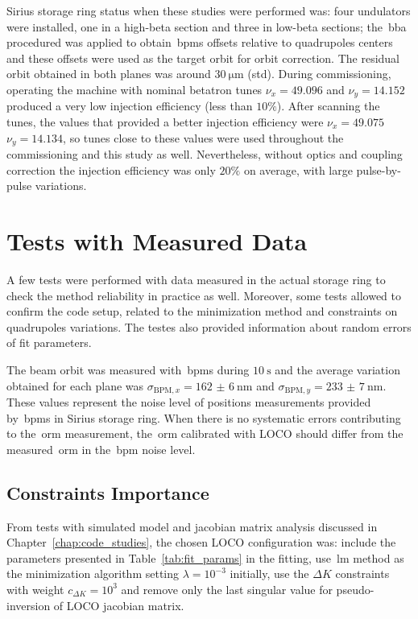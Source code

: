 Sirius storage ring status when these studies were performed was: four undulators were installed, one in a high-beta section and three in low-beta sections; the~\gls{bba} procedured was applied to obtain~\glspl{bpm} offsets relative to quadrupoles centers and these offsets were used as the target orbit for orbit correction. The residual orbit obtained in both planes was around $\SI{30}{\micro\meter}$ (\gls{std}). During commissioning, operating the machine with nominal betatron tunes $\nu_x = 49.096$ and $\nu_y = 14.152$ produced a very low injection efficiency (less than $10\%$). After scanning the tunes, the values that provided a better injection efficiency were $\nu_x = 49.075$ $\nu_y = 14.134$, so tunes close to these values were used throughout the commissioning and this study as well. Nevertheless, without optics and coupling correction the injection efficiency was only $20\%$ on average, with large pulse-by-pulse variations.
\section{Tests with Measured Data}\label{sec:tests_measured}
A few tests were performed with data measured in the actual storage ring to check the method reliability in practice as well. Moreover, some tests allowed to confirm the code setup, related to the minimization method and constraints on quadrupoles variations. The testes also provided information about random errors of fit parameters.

The beam orbit was measured with~\glspl{bpm} during $\SI{10}{\second}$ and the average variation obtained for each plane was $\sigma_{\mathrm{BPM}, x} = \SI{162(6)}{\nano\meter}$ and $\sigma_{\mathrm{BPM}, y} = \SI{233(7)}{\nano\meter}$. These values represent the noise level of positions measurements provided by~\glspl{bpm} in Sirius storage ring. When there is no systematic errors contributing to the~\gls{orm} measurement, the~\gls{orm} calibrated with LOCO should differ from the measured~\gls{orm} in the~\gls{bpm} noise level.

\subsection{Constraints Importance}\label{subsec:loco_config}
From tests with simulated model and jacobian matrix analysis discussed in Chapter~\ref{chap:code_studies}, the chosen LOCO configuration was: include the parameters presented in Table~\ref{tab:fit_params} in the fitting, use~\gls{lm} method as the minimization algorithm setting $\lambda = 10^{-3}$ initially, use the $\Delta K$ constraints with weight $c_{\Delta K} = 10^{3}$ and remove only the last singular value for pseudo-inversion of LOCO jacobian matrix. 


